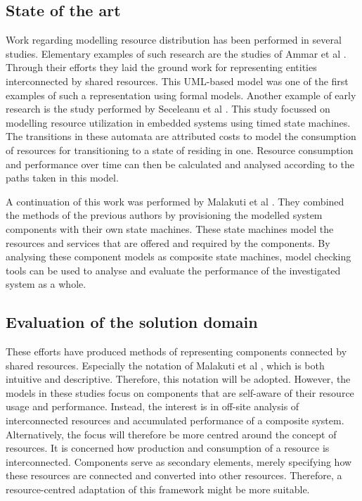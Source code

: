 \subsection{State of the art}
Work regarding modelling resource distribution has been performed in several studies. Elementary examples of such research are the studies of Ammar et al \cite{rum_basis_2}. Through their efforts they laid the ground work for representing entities interconnected by shared resources. This UML-based model was one of the first examples of such a representation using formal models. Another example of early research is the study performed by Seceleanu et al \cite{rum_basis_89}. This study focussed on modelling resource utilization in embedded systems using timed state machines. The transitions in these automata are attributed costs to model the consumption of resources for transitioning to a state of residing in one. Resource consumption and performance over time  can then be calculated and analysed according to the paths taken in this model.

A continuation of this work was performed by Malakuti et al \cite{steven_te_brinke}. They combined the methods of the previous authors by provisioning the modelled system components with their own state machines. These state machines model the resources and services that are offered and required by the components. By analysing these component models as composite state machines, model checking tools can be used to analyse and evaluate the performance of the investigated system as a whole.

\subsection{Evaluation of the solution domain}
These efforts have produced methods of representing components connected by shared resources. Especially the notation of Malakuti et al \cite{steven_te_brinke}, which is both intuitive and descriptive. Therefore, this notation will be adopted. However, the models in these studies focus on components that are self-aware of their resource usage and performance. Instead, the interest is in off-site analysis of interconnected resources and accumulated performance of a composite system. Alternatively, the focus will therefore be more centred around the concept of resources. It is concerned how production and consumption of a resource is interconnected. Components serve as secondary elements, merely specifying how these resources are connected and converted into other resources. Therefore, a resource-centred adaptation of this framework might be more suitable.

